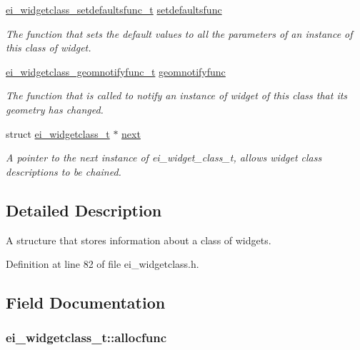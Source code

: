 \begin{DoxyCompactItemize}
\hyperlink{ei__widgetclass_8h_aa04d729c9dca14d3ac92c0f9aa8cc5cb}{ei\+\_\+widgetclass\+\_\+setdefaultsfunc\+\_\+t} \hyperlink{structei__widgetclass__t_a5fec706eefca10172d897cf61b268510}{setdefaultsfunc}
\begin{DoxyCompactList}\small\item\em The function that sets the default values to all the parameters of an instance of this class of widget. \end{DoxyCompactList}\item 
\hyperlink{ei__widgetclass_8h_a751dc2e4c264c3597fcc2d59878f6265}{ei\+\_\+widgetclass\+\_\+geomnotifyfunc\+\_\+t} \hyperlink{structei__widgetclass__t_aaf0aa3f54a48a6b3f8b8e12574ede4b7}{geomnotifyfunc}
\begin{DoxyCompactList}\small\item\em The function that is called to notify an instance of widget of this class that its geometry has changed. \end{DoxyCompactList}\item 
struct \hyperlink{structei__widgetclass__t}{ei\+\_\+widgetclass\+\_\+t} $\ast$ \hyperlink{structei__widgetclass__t_aa184e650475ec2451f033858db1876f0}{next}
\begin{DoxyCompactList}\small\item\em A pointer to the next instance of ei\+\_\+widget\+\_\+class\+\_\+t, allows widget class descriptions to be chained. \end{DoxyCompactList}\end{DoxyCompactItemize}


\subsection{Detailed Description}
A structure that stores information about a class of widgets. 

Definition at line 82 of file ei\+\_\+widgetclass.\+h.



\subsection{Field Documentation}
\hypertarget{structei__widgetclass__t_a233446250cdde4347c1381427923d21a}{
\subsubsection[{allocfunc}]{ ei\+\_\+widgetclass\+\_\+t\+::allocfunc}}\label{structei__widgetclass__t_a233446250cdde4347c1381427923d21a}


